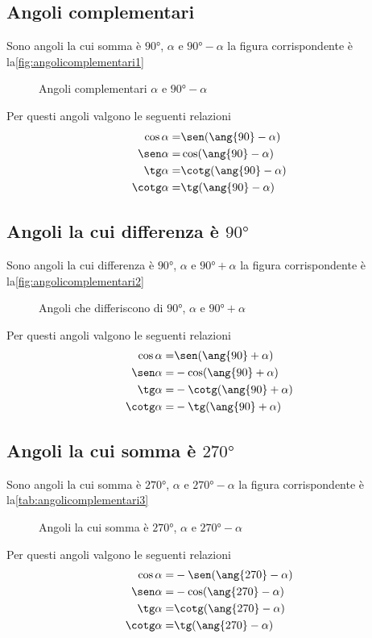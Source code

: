 \subsection{Angoli complementari}
Sono angoli la cui somma è $\ang{90}$, $\alpha$ e $\ang{90}-\alpha$ la figura corrispondente è la\nobs\vref{fig:angolicomplementari1}
\begin{figure} %
	\centering
	
		\caption{Angoli complementari $\alpha$ e  $\ang{90}-\alpha$}
		\label{fig:angolicomplementari1}
\end{figure}
Per questi angoli valgono le seguenti relazioni
\begin{align*}
\cos\alpha=&{}\sen(\ang{90}-\alpha)\\
\sen\alpha=&{}\cos(\ang{90}-\alpha)\\
\tg\alpha=&{}\cotg(\ang{90}-\alpha)\\
\cotg\alpha=&{}\tg(\ang{90}-\alpha)
\end{align*}
\subsection{Angoli la cui differenza è $\ang{90}$}
Sono angoli la cui differenza è $\ang{90}$, $\alpha$ e $\ang{90}+\alpha$ la figura corrispondente è la\nobs\vref{fig:angolicomplementari2}
\begin{figure} %
	\centering
	
\caption{Angoli che differiscono di $\ang{90}$, $\alpha$ e $\ang{90}+\alpha$}
\label{fig:angolicomplementari2}
\end{figure}
Per questi angoli valgono le seguenti relazioni
\begin{align*}
\cos\alpha=&{}\sen(\ang{90}+\alpha)\\
\sen\alpha=&{}-\cos(\ang{90}+\alpha)\\
\tg\alpha=&{}-\cotg(\ang{90}+\alpha)\\
\cotg\alpha=&{}-\tg(\ang{90}+\alpha)
\end{align*}
\subsection{Angoli la cui somma è $\ang{270}$}
Sono angoli la cui somma è $\ang{270}$, $\alpha$ e $\ang{270}-\alpha$ la figura corrispondente è la\nobs\vref{tab:angolicomplementari3}
\begin{figure} %
	\centering
		
		\caption{Angoli la cui somma è $\ang{270}$,  $\alpha$ e $\ang{270}-\alpha$}
		\label{tab:angolicomplementari3}
\end{figure}
Per questi angoli valgono le seguenti relazioni
\begin{align*}
\cos\alpha=&{}-\sen(\ang{270}-\alpha)\\
\sen\alpha=&{}-\cos(\ang{270}-\alpha)\\
\tg\alpha=&{}\cotg(\ang{270}-\alpha)\\
\cotg\alpha=&{}\tg(\ang{270}-\alpha)
\end{align*}
